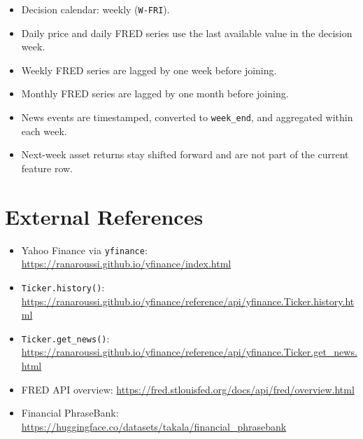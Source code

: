 \documentclass[11pt,a4paper]{article}
\begin{document}
            \begin{itemize}[leftmargin=1.4em]
              \item Decision calendar: weekly (\texttt{W-FRI}).
              \item Daily price and daily FRED series use the last available value in the decision week.
              \item Weekly FRED series are lagged by one week before joining.
              \item Monthly FRED series are lagged by one month before joining.
              \item News events are timestamped, converted to \texttt{week\_end}, and aggregated within each week.
              \item Next-week asset returns stay shifted forward and are not part of the current feature row.
            \end{itemize}

            \section{External References}

            \begin{itemize}[leftmargin=1.4em]
              \item Yahoo Finance via \texttt{yfinance}: \url{https://ranaroussi.github.io/yfinance/index.html}
              \item \texttt{Ticker.history()}: \url{https://ranaroussi.github.io/yfinance/reference/api/yfinance.Ticker.history.html}
              \item \texttt{Ticker.get\_news()}: \url{https://ranaroussi.github.io/yfinance/reference/api/yfinance.Ticker.get_news.html}
              \item FRED API overview: \url{https://fred.stlouisfed.org/docs/api/fred/overview.html}
              \item Financial PhraseBank: \url{https://huggingface.co/datasets/takala/financial_phrasebank}
            \end{itemize}

            
\end{document}
